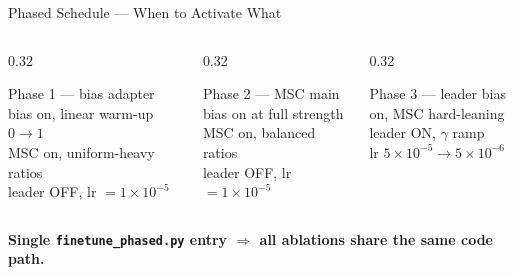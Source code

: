 \documentclass[aspectratio=169,11pt]{beamer}
\begin{document}
\begin{frame}[t]{Phased Schedule --- When to Activate What}
  \vspace{0.35cm}
  \begin{columns}[T,onlytextwidth]
    \begin{column}{0.32\textwidth}
      \begin{block}{Phase 1 --- bias adapter}
        \scriptsize
        bias on, linear warm-up $0\!\to\!1$\\
        MSC on, uniform-heavy ratios\\
        leader OFF, lr $=1\!\times\!10^{-5}$
      \end{block}
    \end{column}
    \hfill
    \begin{column}{0.32\textwidth}
      \begin{block}{Phase 2 --- MSC main}
        \scriptsize
        bias on at full strength\\
        MSC on, balanced ratios\\
        leader OFF, lr $=1\!\times\!10^{-5}$
      \end{block}
    \end{column}
    \hfill
    \begin{column}{0.32\textwidth}
      \begin{block}{Phase 3 --- leader}
        \scriptsize
        bias on, MSC hard-leaning\\
        leader ON, $\gamma$ ramp\\
        lr $5\!\times\!10^{-5}\!\to\!5\!\times\!10^{-6}$
      \end{block}
    \end{column}
  \end{columns}

  \vspace{0.12cm}
  {\scriptsize\color{sdmblue}\textbf{Single \texttt{finetune\_phased.py} entry $\Rightarrow$ all ablations share the same code path.}}
\end{frame}
\end{document}
